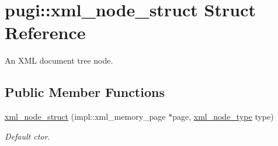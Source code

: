 \hypertarget{structpugi_1_1xml__node__struct}{\section{pugi\-:\-:xml\-\_\-node\-\_\-struct Struct Reference}
\label{structpugi_1_1xml__node__struct}
}


An X\-M\-L document tree node.  


\subsection*{Public Member Functions}
\begin{DoxyCompactItemize}
\item 
\hyperlink{structpugi_1_1xml__node__struct_af9af20f835af8b6b99f9a39c93920ea6}{xml\-\_\-node\-\_\-struct} (impl\-::xml\-\_\-memory\-\_\-page $\ast$page, \hyperlink{namespacepugi_a137e94a038e4ab0ada6477cf7f6153a9}{xml\-\_\-node\-\_\-type} type)
\begin{DoxyCompactList}\small\item\em Default ctor. \end{DoxyCompactList}\end{DoxyCompactItemize}
